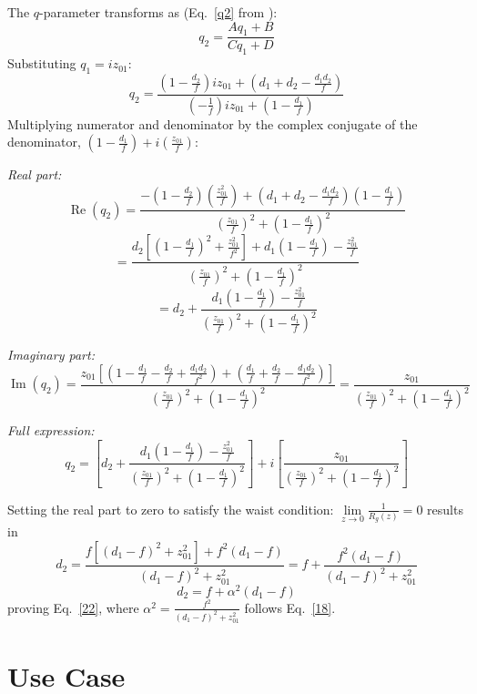 \documentclass[11pt, letterpaper]{article}
\begin{document}
\begin{enumerate}
The $q$-parameter transforms as (Eq.~\ref{q2} from \cite{Osche}):
\begin{equation}\label{q2}
q_2 = \frac{A q_1 + B}{C q_1 + D}
\end{equation}
Substituting $q_1=iz_{01}$:
$$q_2=\frac{\left(1 - \frac{d_2}{f}\right)iz_{01} + \left(d_1 + d_2 - \frac{d_1 d_2}{f}\right)}{\left(-\frac{1}{f}\right)iz_{01} + \left(1 - \frac{d_1}{f}\right)}$$
Multiplying numerator and denominator by the complex conjugate of the denominator,
$\left(1 - \frac{d_1}{f}\right)+i\left(\frac{z_{01}}{f}\right)$:

\medskip
\textit{Real part:}
$$\operatorname{Re}(q_2)=\frac{-\left(1-\frac{d_2}{f}\right)\left(\frac{z_{01}^2}{f}\right)+\left(d_1+d_2-\frac{d_1d_2}{f}\right)\left(1-\frac{d_1}{f}\right)}{\left(\frac{z_{01}}{f}\right)^2+\left(1-\frac{d_1}{f}\right)^2}$$
$$=\frac{d_2\left[\left(1 - \frac{d_1}{f}\right)^2 + \frac{z_{01}^2}{f^2}\right] + d_1\left(1 - \frac{d_1}{f}\right) - \frac{z_{01}^2}{f}}{\left(\frac{z_{01}}{f}\right)^2+\left(1-\frac{d_1}{f}\right)^2}$$
$$= d_2 + \frac{d_1\left(1 - \frac{d_1}{f}\right) - \frac{z_{01}^2}{f}}{\left(\frac{z_{01}}{f}\right)^2+\left(1-\frac{d_1}{f}\right)^2}$$

\medskip
\textit{Imaginary part:}
$$\operatorname{Im}(q_2)=\frac{z_{01}\left[\left(1-\frac{d_1}{f}-\frac{d_2}{f}+\frac{d_1d_2}{f^2}\right)+\left(\frac{d_1}{f}+\frac{d_2}{f}-\frac{d_1d_2}{f^2}\right)\right]}{\left(\frac{z_{01}}{f}\right)^2+\left(1-\frac{d_1}{f}\right)^2}
=\frac{z_{01}}{\left(\frac{z_{01}}{f}\right)^2+\left(1-\frac{d_1}{f}\right)^2}$$

\medskip
\textit{Full expression:}
$$q_2=\left[d_2 + \frac{d_1\!\left(1 - \frac{d_1}{f}\right) - \frac{z_{01}^2}{f}}{\left(\frac{z_{01}}{f}\right)^2+\left(1-\frac{d_1}{f}\right)^2}\right]+i\left[\frac{z_{01}}{\left(\frac{z_{01}}{f}\right)^2+\left(1-\frac{d_1}{f}\right)^2}\right]$$

Setting the real part to zero to satisfy the waist condition: $\lim\limits_{z\to 0}\frac{1}{R_g(z)}=0$ results in
$$d_2 = \frac{f\!\left[(d_1-f)^2 + z_{01}^2\right] + f^2(d_1-f)}{(d_1-f)^2+z_{01}^2}
= f + \frac{f^2(d_1-f)}{(d_1-f)^2+z_{01}^2}$$
$$d_2 = f + \alpha^2(d_1 - f)$$
proving Eq.~\ref{22}, where $\alpha^2 = \frac{f^2}{(d_1-f)^2+z_{01}^2}$ follows Eq.~\ref{18}.
\end{enumerate}

\section{Use Case}
\end{document}
